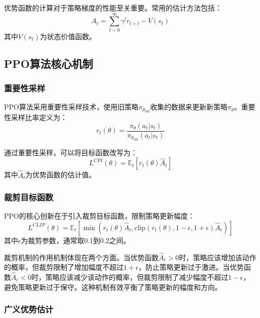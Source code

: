 \documentclass[12pt,a4paper]{article}
\begin{document}
优势函数的计算对于策略梯度的性能至关重要。常用的估计方法包括：
\begin{equation}
    A_t = \sum_{l=0}^{\infty} \gamma^l r_{t+l} - V(s_t)
\end{equation}
其中$V(s_t)$为状态价值函数。

\subsection{PPO算法核心机制}

\subsubsection{重要性采样}

PPO算法采用重要性采样技术，使用旧策略$\pi_{\theta_{old}}$收集的数据来更新新策略$\pi_\theta$。重要性采样比率定义为：
\begin{equation}
    r_t(\theta) = \frac{\pi_\theta(a_t|s_t)}{\pi_{\theta_{old}}(a_t|s_t)}
\end{equation}

通过重要性采样，可以将目标函数改写为：
\begin{equation}
    L^{CPI}(\theta) = \mathbb{E}_t \left[ r_t(\theta) \hat{A}_t \right]
\end{equation}
其中$\hat{A}_t$为优势函数的估计值。

\subsubsection{裁剪目标函数}

PPO的核心创新在于引入裁剪目标函数，限制策略更新幅度：
\begin{equation}
    L^{CLIP}(\theta) = \mathbb{E}_t \left[ \min \left( r_t(\theta) \hat{A}_t, \text{clip}(r_t(\theta), 1-\epsilon, 1+\epsilon) \hat{A}_t \right) \right]
\end{equation}
其中$\epsilon$为裁剪参数，通常取0.1到0.2之间。

裁剪机制的作用机制体现在两个方面。当优势函数$\hat{A}_t > 0$时，策略应该增加该动作的概率，但裁剪限制了增加幅度不超过$1+\epsilon$，防止策略更新过于激进。当优势函数$\hat{A}_t < 0$时，策略应该减少该动作的概率，但裁剪限制了减少幅度不超过$1-\epsilon$，避免策略更新过于保守。这种机制有效平衡了策略更新的幅度和方向。

\subsubsection{广义优势估计}
\end{document}

